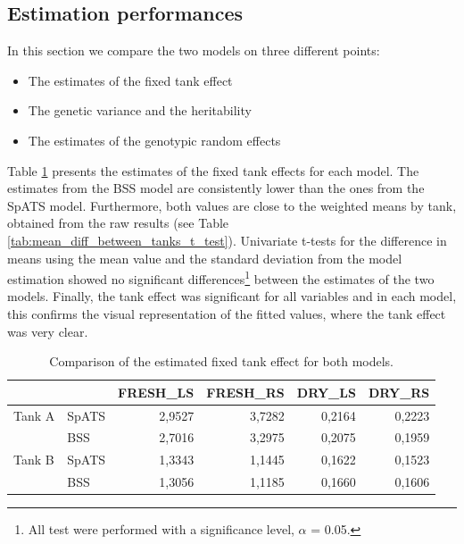 \subsection{Estimation performances}
In this section we compare the two models on three different points:
\begin{itemize}
	\item The estimates of the fixed tank effect
	\item The genetic variance and the heritability
	\item The estimates of the genotypic random effects
\end{itemize}
Table \ref{tab:tank_effect_model_comparison} presents the estimates of the fixed tank effects for each model. The estimates from the BSS model are consistently lower than the ones from the SpATS model. Furthermore, both values are close to the weighted means by tank, obtained from the raw results (see Table \ref{tab:mean_diff_between_tanks_t_test}). Univariate t-tests for the difference in means using the mean value and the standard deviation from the model estimation showed no significant differences\footnote{All test were performed with a significance level, $\alpha$ = 0.05.} between the estimates of the two models. Finally, the tank effect was significant for all variables and in each model, this confirms the visual representation of the fitted values, where the tank effect was very clear.\\

\begin{table}[htbp]
  \centering
  \caption{Comparison of the estimated fixed tank effect for both models.}
    \begin{tabular}{llrrrr}
    \toprule
          &       & \multicolumn{1}{l}{FRESH\_LS} & \multicolumn{1}{l}{FRESH\_RS} & \multicolumn{1}{l}{DRY\_LS} & \multicolumn{1}{l}{DRY\_RS} \\
    \midrule
    Tank A & SpATS & 2,9527 & 3,7282 & 0,2164 & 0,2223 \\
           & BSS   & 2,7016 & 3,2975 & 0,2075 & 0,1959 \\
    \midrule
    Tank B & SpATS & 1,3343 & 1,1445 & 0,1622 & 0,1523 \\
          & BSS   & 1,3056 & 1,1185 & 0,1660 & 0,1606 \\
    \bottomrule
    \end{tabular}%

  \label{tab:tank_effect_model_comparison}%
\end{table}%

